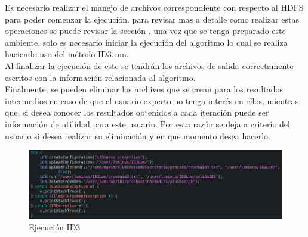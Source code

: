 Es necesario realizar el manejo de archivos correspondiente con respecto al HDFS para poder comenzar la ejecución. para revisar mas a detalle como realizar estas operaciones se puede revisar la sección .
una vez que se tenga preparado este ambiente, solo es necesario iniciar la ejecución del algoritmo lo cual se realiza haciendo uso del método ID3.run.\\
Al finalizar la ejecución de este se tendrán los archivos de salida correctamente escritos con la información relacionada al algoritmo.\\
Finalmente, se pueden eliminar los archivos que se crean para los resultados intermedios en caso de que el usuario experto no tenga interés en ellos, mientras que, si desea conocer los resultados obtenidos a cada iteración puede ser información de utilidad para este usuario. Por esta razón se deja a criterio del usuario si desea realizar su eliminación y en que momento desea hacerlo.
\begin{figure}[H]
	\begin{center}
		\hypertarget{fig:defichida1}{\hspace{1pt}}
		\includegraphics[width=1\textwidth]{capitulo4b/images/ID3exec.png}
		\caption{Ejecución ID3}
		\label{fig:defichida1}
	\end{center}
\end{figure}